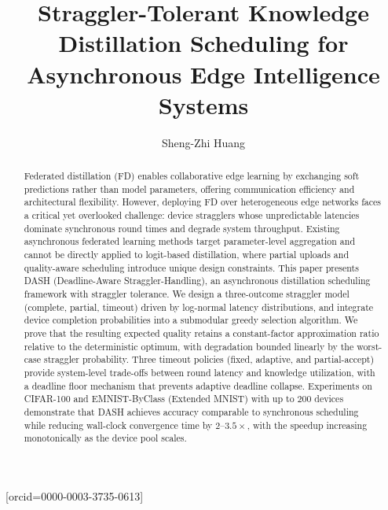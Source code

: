 \documentclass[a4paper,fleqn]{cas-dc}
\begin{document}
	\let\WriteBookmarks\relax
	\def\floatpagepagefraction{1}
	\def\textpagefraction{.001}
	
	
	\title[mode=title]{Straggler-Tolerant Knowledge Distillation
		Scheduling for Asynchronous Edge Intelligence Systems}
	
	\author[1]{Sheng-Zhi Huang}[orcid=0000-0003-3735-0613]
	\cormark[1]
	
	\begin{abstract}
		Federated distillation (FD) enables collaborative edge learning by
		exchanging soft predictions rather than model parameters, offering
		communication efficiency and architectural flexibility.  However,
		deploying FD over heterogeneous edge networks faces a critical yet
		overlooked challenge: device stragglers whose unpredictable
		latencies dominate synchronous round times and degrade system
		throughput.  Existing asynchronous federated learning methods target
		parameter-level aggregation and cannot be directly applied to
		logit-based distillation, where partial uploads and quality-aware
		scheduling introduce unique design constraints.  This paper presents
		DASH (Deadline-Aware Straggler-Handling), an asynchronous
		distillation scheduling framework with straggler tolerance.  We
		design a three-outcome straggler model (complete, partial, timeout)
		driven by log-normal latency distributions, and integrate device
		completion probabilities into a submodular greedy selection
		algorithm.  We prove that the resulting expected quality retains a
		constant-factor approximation ratio relative to the deterministic
		optimum, with degradation bounded linearly by the worst-case
		straggler probability.  Three timeout policies (fixed, adaptive,
		and partial-accept) provide system-level trade-offs between round
		latency and knowledge utilization, with a deadline floor mechanism
		that prevents adaptive deadline collapse.  Experiments on CIFAR-100
		and EMNIST-ByClass (Extended MNIST) with up to 200 devices
		demonstrate that DASH achieves accuracy comparable to synchronous
		scheduling while reducing wall-clock convergence time by
		$2$--$3.5\times$, with the speedup increasing monotonically as the
		device pool scales.
	\end{abstract}
	
\end{document}

